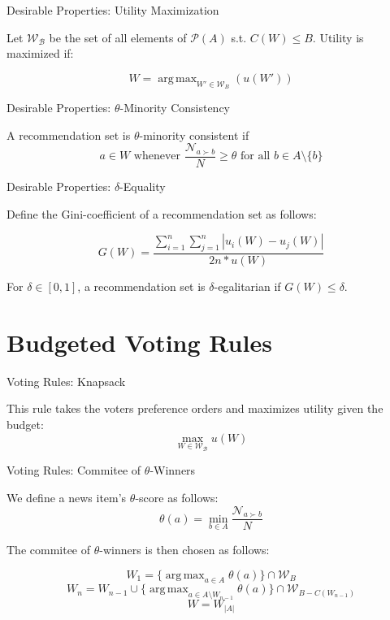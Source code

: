 \documentclass{beamer}
\DeclareMathOperator*{\argmax}{arg\,max}
\begin{document}
\begin{frame}{Desirable Properties: Utility Maximization}

Let $\mathcal {W_B}$ be the set of all elements of $\mathcal{P}(A)$ s.t. $C(W)\leq B$. Utility is maximized if:

\[
W=\argmax_{W'\in \mathcal{W}_B}(u(W')) 
\]

	
\end{frame}

\begin{frame}{Desirable Properties: $\theta$-Minority Consistency}
	
A recommendation set is $\theta$-minority consistent if \[a\in W\text{ whenever }\frac {\mathcal{N}_{a\succ b}}{N}\geq \theta \text{ for all } b\in A\setminus \{b\} \]
	
\end{frame}

\begin{frame}{Desirable Properties: $\delta$-Equality}
	
	Define the Gini-coefficient of a recommendation set as follows: 
	
	\[G(W)=\frac{\displaystyle{\sum_{i=1}^n \sum_{j=1}^n \left| u_i(W) - u_j(W) \right|}}{\displaystyle{2n* u(W)}}\]
	
	For $\delta\in [0,1]$, a recommendation set is $\delta$-egalitarian if $G(W)\leq \delta$. 
	
\end{frame}

\section{Budgeted Voting Rules}

\begin{frame}{Voting Rules: Knapsack}

This rule takes the voters preference orders and maximizes utility given the budget:
\[
\max_{W\in\mathcal{ W_B}} u(W)
	\]
	
\end{frame}

\begin{frame}{Voting Rules: Commitee of $\theta$-Winners}
	
We define a news item's $\theta$-score as follows: \[\theta(a)=\min_{b\in A} \frac{\mathcal{N}_{a\succ b}}{N}\]

The commitee of $\theta$-winners is then chosen as follows:

\[W_1=\{\argmax_{a\in A}\theta(a)\}\cap \mathcal{W}_B\]
\[W_n=W_{n-1}\cup \{\argmax_{a\in A\setminus W_{n-1}}\theta (a)\}\cap \mathcal{W}_{B-C(W_{n-1})}\]
\[W=W_{|A|}\]

\end{frame}
\end{document}
